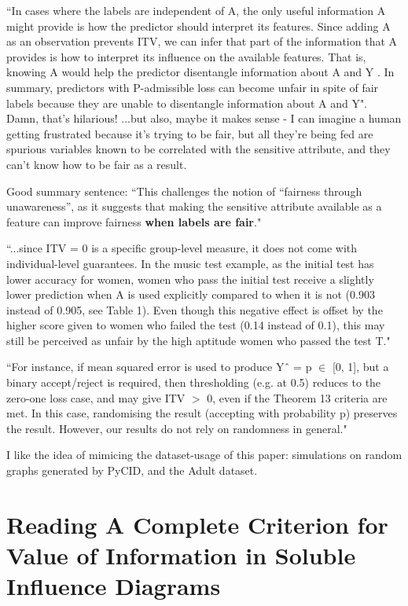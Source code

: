 \documentclass[letterpaper,10pt]{article}
\begin{document}
``In cases where the labels are independent of A, the only useful information A might provide is how the predictor should interpret its features. Since adding A as an observation prevents ITV, we can infer that part of the information that A provides is how to interpret its influence on the available features. That is, knowing A would help the predictor disentangle information about A and Y . In summary, predictors with P-admissible loss can become unfair in spite of fair labels because they are unable to disentangle information about A and Y".
Damn, that's hilarious!
...but also, maybe it makes sense - I can imagine a human getting frustrated because it's trying to be fair, but all they're being fed are spurious variables known to be correlated with the sensitive attribute, and they can't know how to be fair as a result.

Good summary sentence:
``This challenges the notion of “fairness through unawareness”, as it suggests that making the sensitive attribute available as a feature can improve fairness \textbf{when labels are fair}."

``...since ITV = 0 is a specific group-level measure, it does not come with individual-level guarantees. In the music test example, as the initial test has lower accuracy for women, women who pass the initial test receive a slightly lower prediction when A is used explicitly compared to when it is not (0.903 instead of 0.905, see Table 1). Even though this negative effect is offset by the higher score given to women who failed the test (0.14 instead of 0.1), this may still be perceived as unfair by the high aptitude women who passed the test T."

``For instance, if mean squared error is used to produce Yˆ = p $\in$ [0, 1], but a binary accept/reject is required, then thresholding (e.g. at 0.5) reduces to the zero-one loss case, and may give ITV $>$ 0, even if the Theorem 13 criteria are met. In this case, randomising the result (accepting with probability p) preserves the result. However, our results do not rely on randomness in general."

I like the idea of mimicing the dataset-usage of this paper: simulations on random graphs generated by PyCID, and the Adult dataset.

\section{Reading A Complete Criterion for Value of Information in Soluble Influence Diagrams}
\end{document}

